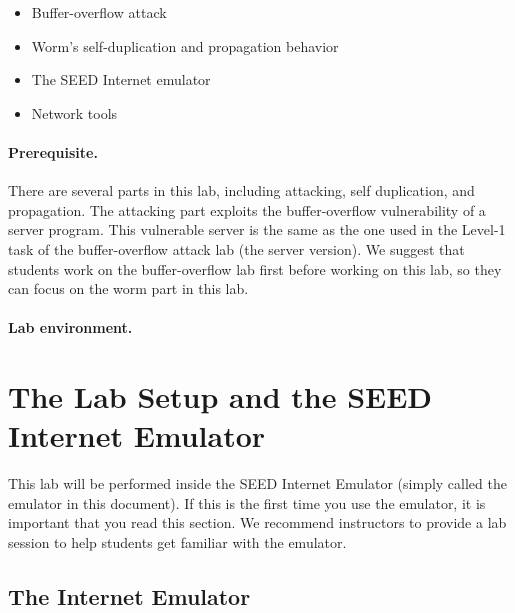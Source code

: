 \begin{itemize}[noitemsep]
\item Buffer-overflow attack
\item Worm's self-duplication and propagation behavior
\item The SEED Internet emulator 
\item Network tools 
\end{itemize}


\paragraph{Prerequisite.} 
There are several parts in this lab, including attacking, self duplication, and 
propagation. The attacking part exploits the buffer-overflow vulnerability
of a server program. This vulnerable server is the same as 
the one used in the Level-1 task of the buffer-overflow attack 
lab (the server version). We suggest that students 
work on the buffer-overflow lab first before working on this lab,
so they can focus on the worm part in this lab.


\paragraph{Lab environment.} 
\seedenvironmentB
\nodependency


\section{The Lab Setup and the SEED Internet Emulator}
\label{sec:emulator}

This lab will be performed inside the SEED Internet Emulator (simply
called the emulator in this document). If this is the first time you
use the emulator, it is important that you read this section. 
We recommend instructors to provide a lab session to 
help students get familiar with the emulator.  


\subsection{The Internet Emulator} 




